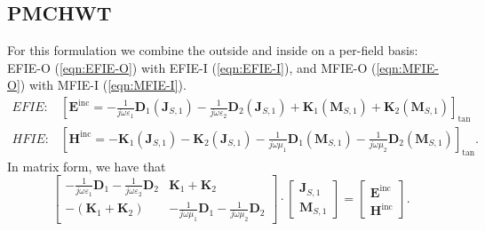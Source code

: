 \documentclass[a4paper,10pt]{book}
\newcommand{\field}[1]{\mathbf{#1}}
\newcommand{\current}[1]{\mathbf{#1}}
\newcommand{\operator}[1]{\mathbf{#1}}
\begin{document}
\subsection{PMCHWT}
\label{subsec:PMCHWT}
%
\par
For this formulation we combine the outside and inside on a per-field basis: EFIE-O (\ref{eqn:EFIE-O}) with EFIE-I (\ref{eqn:EFIE-I}), and MFIE-O (\ref{eqn:MFIE-O}) with MFIE-I (\ref{eqn:MFIE-I}).
\begin{eqnarray}
EFIE: & \boxed{
\left[\field{E}^\text{inc} =  -\frac{1}{j \omega \varepsilon_1} \operator{D}_{1}\left(\current{J}_{S,1}\right) - \frac{1}{j \omega \varepsilon_2} \operator{D}_{2}\left(\current{J}_{S,1}\right) + \operator{K}_{1}\left(\current{M}_{S,1}\right) + \operator{K}_{2}\left(\current{M}_{S,1}\right) \right]_\text{tan} } \\
HFIE: & \boxed{
\left[\field{H}^\text{inc} = - \operator{K}_{1}\left(\current{J}_{S,1}\right) - \operator{K}_{2}\left(\current{J}_{S,1}\right) - \frac{1}{j \omega \mu_1}\operator{D}_{1}\left(\current{M}_{S,1}\right) - \frac{1}{j \omega \mu_2}\operator{D}_{2}\left(\current{M}_{S,1}\right)  \right]_\text{tan} }.
\end{eqnarray}
In matrix form, we have that
\begin{equation}
\left[
\begin{matrix}
  -\frac{1}{j \omega \varepsilon_1} \operator{D}_{1} - \frac{1}{j \omega \varepsilon_2} \operator{D}_{2} & \operator{K}_{1} + \operator{K}_{2} \\
  -\left(\operator{K}_{1} + \operator{K}_{2} \right) & - \frac{1}{j \omega \mu_1}\operator{D}_{1} - \frac{1}{j \omega \mu_2}\operator{D}_{2}
\end{matrix}
\right]
\cdot 
\left[
\begin{matrix}
  \current{J}_{S,1} \\
  \current{M}_{S,1}  
\end{matrix}
\right]
=
\left[
\begin{matrix}
  \field{E}^\text{inc} \\
  \field{H}^\text{inc}
\end{matrix}
\right].
\end{equation}
\end{document}
